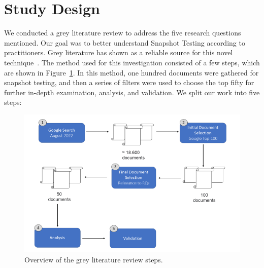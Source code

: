\documentclass[
	msc, %
	english %
]{../ppgccufmg}
\begin{document}
		\section{Study Design}\label{sec:ch3-study-design}

        We conducted a grey literature review to address the five research questions mentioned. Our goal was to better understand Snapshot Testing according to practitioners. Grey literature has shown as a reliable source for this novel technique~\cite{kamei2021information}. The method used for this investigation consisted of a few steps, which are shown in Figure~\ref{fig:grey-literature-design-study}. In this method, one hundred documents were gathered for snapshot testing, and then a series of filters were used to choose the top fifty for further in-depth examination, analysis, and validation. We split our work into five steps:

        \begin{figure}[h]
            \centering
            \includegraphics[width=\textwidth]{img/grey_literature_study_design.png}
            \caption{Overview of the grey literature review steps.}\label{fig:grey-literature-design-study}
        \end{figure}
\end{document}
